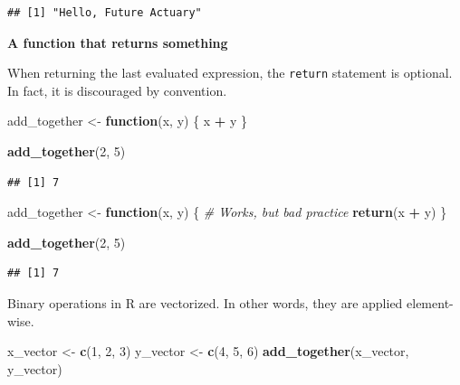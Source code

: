 \documentclass[openany]{book}
\newenvironment{Shaded}{\begin{snugshade}}{\end{snugshade}}
\newcommand{\CommentTok}[1]{\textcolor[rgb]{0.56,0.35,0.01}{\textit{#1}}}
\newcommand{\ControlFlowTok}[1]{\textcolor[rgb]{0.13,0.29,0.53}{\textbf{#1}}}
\newcommand{\DecValTok}[1]{\textcolor[rgb]{0.00,0.00,0.81}{#1}}
\newcommand{\KeywordTok}[1]{\textcolor[rgb]{0.13,0.29,0.53}{\textbf{#1}}}
\newcommand{\NormalTok}[1]{#1}
\newcommand{\OperatorTok}[1]{\textcolor[rgb]{0.81,0.36,0.00}{\textbf{#1}}}
\newcommand{\StringTok}[1]{\textcolor[rgb]{0.31,0.60,0.02}{#1}}
\begin{document}
\begin{verbatim}
## [1] "Hello, Future Actuary"
\end{verbatim}

\textbf{A function that returns something}

When returning the last evaluated expression, the \texttt{return} statement is optional.
In fact, it is discouraged by convention.

\begin{Shaded}
\begin{Highlighting}[]
\NormalTok{add_together <-}\StringTok{ }\ControlFlowTok{function}\NormalTok{(x, y) \{}
\NormalTok{  x }\OperatorTok{+}\StringTok{ }\NormalTok{y}
\NormalTok{\}}

\KeywordTok{add_together}\NormalTok{(}\DecValTok{2}\NormalTok{, }\DecValTok{5}\NormalTok{)}
\end{Highlighting}
\end{Shaded}

\begin{verbatim}
## [1] 7
\end{verbatim}

\begin{Shaded}
\begin{Highlighting}[]
\NormalTok{add_together <-}\StringTok{ }\ControlFlowTok{function}\NormalTok{(x, y) \{}
  \CommentTok{# Works, but bad practice}
  \KeywordTok{return}\NormalTok{(x }\OperatorTok{+}\StringTok{ }\NormalTok{y)}
\NormalTok{\}}

\KeywordTok{add_together}\NormalTok{(}\DecValTok{2}\NormalTok{, }\DecValTok{5}\NormalTok{)}
\end{Highlighting}
\end{Shaded}

\begin{verbatim}
## [1] 7
\end{verbatim}

Binary operations in R are vectorized. In other words, they are applied element-wise.

\begin{Shaded}
\begin{Highlighting}[]
\NormalTok{x_vector <-}\StringTok{ }\KeywordTok{c}\NormalTok{(}\DecValTok{1}\NormalTok{, }\DecValTok{2}\NormalTok{, }\DecValTok{3}\NormalTok{)}
\NormalTok{y_vector <-}\StringTok{ }\KeywordTok{c}\NormalTok{(}\DecValTok{4}\NormalTok{, }\DecValTok{5}\NormalTok{, }\DecValTok{6}\NormalTok{)}
\KeywordTok{add_together}\NormalTok{(x_vector, y_vector)}
\end{Highlighting}
\end{Shaded}
\end{document}
